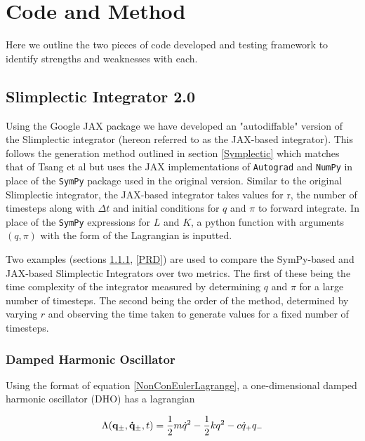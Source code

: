 \documentclass[10pt]{iopart}
\begin{document}
\section{Code and Method}
Here we outline the two pieces of code developed and testing framework to identify strengths and weaknesses with each. 

\subsection{Slimplectic Integrator 2.0}
\label{SI2.0}
Using the Google JAX package we have developed an "autodiffable" version of the Slimplectic integrator (hereon referred to as the JAX-based integrator). This follows the generation method outlined in section \ref{Symplectic} which matches that of Tsang et al \cite{Tsang_Slimplectic} but uses the JAX implementations of \texttt{Autograd} and \texttt{NumPy} in place of the \texttt{SymPy} package used in the original version. Similar to the original Slimplectic integrator, the JAX-based integrator takes values for r, the number of timesteps along with $\Delta t$ and initial conditions for $q$ and $\pi$ to forward integrate. In place of the \texttt{SymPy} expressions for $L$ and $K$, a python function with arguments $(q,\pi)$ with the form of the Lagrangian is inputted. 

Two examples (sections \ref{DHO}, \ref{PRD}) are used to compare the SymPy-based and JAX-based Slimplectic Integrators over two metrics. The first of these being the time complexity of the integrator measured by determining $q$ and $\pi$ for a large number of timesteps. The second being the order of the method, determined by varying $r$ and observing the time taken to generate values for a fixed number of timesteps.


\subsubsection{Damped Harmonic Oscillator \\}
\label{DHO}
Using the format of equation \ref{NonConEulerLagrange}, a one-dimensional damped harmonic oscillator (DHO) has a lagrangian

\begin{equation}
\label{DHOeqn}
	\Lambda(\bold{q_{\pm},\dot{q}_{\pm}},t) = \frac{1}{2}m\dot{q}^2 - \frac{1}{2}kq^2 - c\dot{q}_+q_-
\end{equation}
\end{document}
